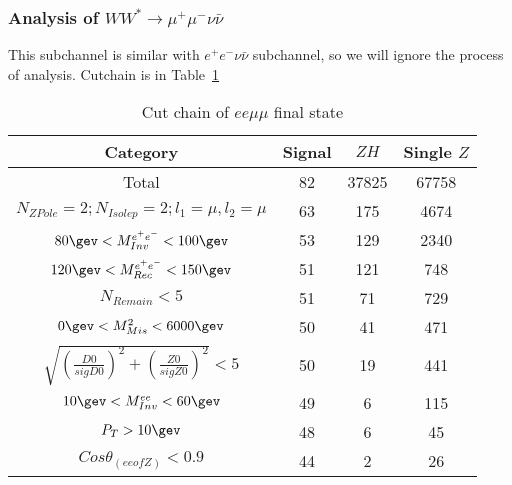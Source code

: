 \documentclass[11pt,a4paper]{cepcnote}
\begin{document}
\subsubsection{Analysis of $WW^*\rightarrow \mu^+\mu^-\nu\bar{\nu}$}
This subchannel is similar with $e^+e^-\nu\bar{\nu}$ subchannel, so we will ignore the process of analysis.
Cutchain is in Table~\ref{tab:uucutchain}
\begin{table}[H]
  \begin{center}
    \begin{tabular}{cccc}
      \hline \hline
      \multicolumn{1}{c}{Category}      & \multicolumn{1}{c}{Signal}&\multicolumn{1}{c}{$ZH$}&\multicolumn{1}{c}{Single $Z$}\\ 
      \hline
      Total		       	 									& 82	& 37825	& 67758\\
      $N_{ZPole}=2; N_{Isolep}=2; l_1 = \mu, l_2 = \mu$	 	& 63	& 175	& 4674\\
      $80\gev < M_{Inv}^{e^+e^-} < 100\gev$         		& 53	& 129	& 2340\\
	  $120\gev < M_{Rec}^{e^+e^-} < 150\gev$        		& 51	& 121	& 748\\
	  $N_{Remain} < 5$										& 51	& 71	& 729\\
	  $0\gev < M_{Mis}^{2} < 6000\gev$			        	& 50	& 41	& 471\\
	  $\sqrt{(\frac{D0}{sigD0})^2+(\frac{Z0}{sigZ0})^2} < 5$& 50	& 19	& 441\\
	  $10\gev < M_{Inv}^{ee} < 60\gev$						& 49	& 6		& 115\\
	  $P_{T} > 10\gev$										& 48	& 6		& 45\\
	  $Cos\theta_{(ee of Z)} < 0.9$							& 44	& 2		&  26\\
      \hline \hline
    \end{tabular}
   \caption[Monte Carlo purities in the single lepton sample]{Cut chain of $ee \mu\mu$ final state}
  \label{tab:uucutchain}
 \end{center}
\end{table}
\end{document}
